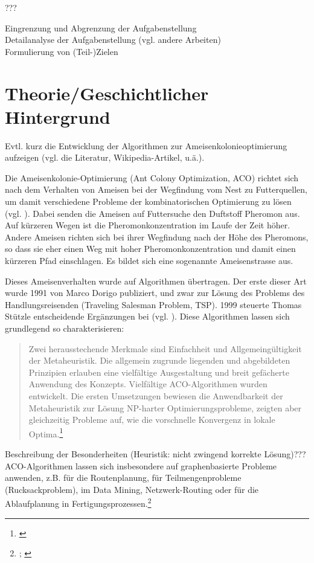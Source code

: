???

Eingrenzung und Abgrenzung der Aufgabenstellung \\

Detailanalyse der Aufgabenstellung (vgl. andere Arbeiten) \\

Formulierung von (Teil-)Zielen \\

\vspace*{1cm}


\section{Theorie/Geschichtlicher Hintergrund} 

Evtl. kurz die Entwicklung der Algorithmen zur Ameisenkolonieoptimierung aufzeigen (vgl. die Literatur, Wikipedia-Artikel, u.ä.).


Die Ameisenkolonie-Optimierung (Ant Colony Optimization, ACO) richtet sich nach dem Verhalten von Ameisen bei der Wegfindung vom Nest zu Futterquellen, um damit verschiedene Probleme der kombinatorischen Optimierung zu lösen (vgl. \cite[S. 1]{sch-koa}). Dabei senden die Ameisen auf Futtersuche den Duftstoff Pheromon aus. Auf kürzeren Wegen ist die Pheromonkonzentration im Laufe der Zeit höher. Andere Ameisen richten sich bei ihrer Wegfindung nach der Höhe des Pheromons, so dass sie eher einen Weg mit hoher Pheromonkonzentration und damit einen kürzeren Pfad einschlagen. Es bildet sich eine sogenannte Ameisenstrasse aus.

Dieses Ameisenverhalten wurde auf Algorithmen übertragen. Der erste dieser Art wurde 1991 von Marco Dorigo publiziert, und zwar zur Lösung des Problems des Handlungsreisenden (Traveling Salesman Problem, TSP). 1999 steuerte Thomas Stützle entscheidende Ergänzungen bei (vgl. \cite{ds-ant, wiki-antalg}). Diese Algorithmen lassen sich grundlegend so charakterisieren: \blockquote{Zwei herausstechende Merkmale sind Einfachheit und Allgemeingültigkeit der Metaheuristik. Die allgemein zugrunde liegenden und abgebildeten Prinzipien erlauben eine vielfältige Ausgestaltung und breit gefächerte Anwendung des Konzepts. Vielfältige ACO-Algorithmen wurden entwickelt. Die ersten Umsetzungen bewiesen die Anwendbarkeit der Metaheuristik zur Lösung NP-harter Optimierungsprobleme, zeigten aber gleichzeitig Probleme auf, wie die vorschnelle Konvergenz in lokale Optima.\footnote{\cite[S. 19]{sch-koa}}}


Beschreibung der Besonderheiten (Heuristik: nicht zwingend korrekte Lösung)??? \\

\noindent
ACO-Algorithmen lassen sich insbesondere auf graphenbasierte Probleme anwenden, z.B. für die Routenplanung, für Teilmengenprobleme (Rucksackproblem), im Data Mining, Netzwerk-Routing oder für die Ablaufplanung in Fertigungsprozessen.\footnote{\cite[Vgl.][S. 15ff.]{sch-koa}; \cite[vgl.][]{wiki-antalg}} \\



\vspace*{1cm}
